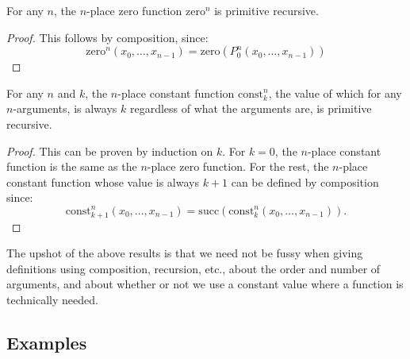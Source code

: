 \documentclass[12pt]{report}
\theoremstyle{nonumberplain}
\newtheorem{proof}{Proof}
\begin{document}
\begin{mt}
For any $n$, the $n$-place zero function $\mathrm{zero}^n$ is primitive recursive.
\end{mt}
\begin{proof}
This follows by composition, since:
\begin{equation*}	\mathrm{zero}^n(x_0, \dotsc , x_{n-1}) = \mathrm{zero}(P^n_0(x_0, \dotsc , x_{n-1}))\end{equation*}
\end{proof}

\begin{mt}
For any $n$ and $k$, the $n$-place constant function $\mathrm{const}^n_k$, the value of which for any $n$-arguments, is always $k$ regardless of what the arguments are, is primitive recursive.
\end{mt}

\begin{proof}
This can be proven by induction on $k$. For $k = 0$, the $n$-place constant function is the same as the $n$-place zero function. For the rest, the $n$-place constant function whose value is always $k + 1$ can be defined by composition since:
\begin{equation*}
\mathrm{const}^n_{k+1}(x_0, \dotsc , x_{n-1}) = \mathrm{succ}(\mathrm{const}^n_k(x_0, \dotsc , x_{n-1})).
\end{equation*}
\end{proof}

\noindent The upshot of the above results is that we need not be fussy when giving definitions using composition, recursion, etc., about the order and number of arguments, and about whether or not we use a constant value where a function is technically needed.

\subsection*{Examples}
\end{document}
